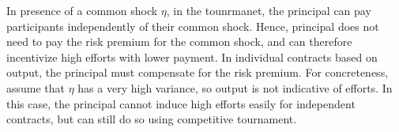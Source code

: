 In presence of a common shock $\eta$, in the tounrmanet, the principal can pay participants independently of their common shock. Hence, principal does not need to pay the risk premium for the common shock, and can therefore incentivize high efforts with lower payment. In individual contracts based on output, the principal must compensate for the risk premium. For concreteness, assume that $\eta$ has a very high variance, so output is not indicative of efforts. In this case, the principal cannot induce high efforts easily for independent contracts, but can still do so using competitive tournament.